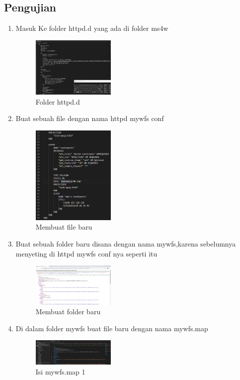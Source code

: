 \subsection{Pengujian}
\begin{enumerate}
  \item Masuk Ke folder httpd.d yang ada di folder ms4w
  \hfill\break
    \begin{figure}[H]
		\includegraphics[width=4cm]{figures/1174005/4/10.png}
		\centering
		\caption{Folder httpd.d}
    \end{figure}

  \item Buat sebuah file dengan nama httpd mywfs conf
  \hfill\break
    \begin{figure}[H]
		\includegraphics[width=4cm]{figures/1174005/4/11.png}
		\centering
		\caption{Membuat file baru}
    \end{figure}

  \item Buat sebuah folder baru disana dengan nama mywfs,karena sebelumnya menyeting di httpd mywfs conf nya seperti itu
  \hfill\break
    \begin{figure}[H]
		\includegraphics[width=4cm]{figures/1174005/4/12.png}
		\centering
		\caption{Membuat folder baru}
    \end{figure}

  \item Di dalam folder mywfs buat file baru dengan nama mywfs.map
  \hfill\break
    \begin{figure}[H]
		\includegraphics[width=4cm]{figures/1174005/4/13.png}
		\centering
		\caption{Isi mywfs.map 1}
    \end{figure}


\end{enumerate}

